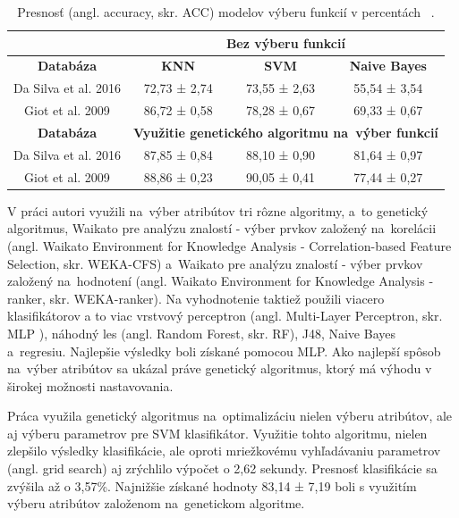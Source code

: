 \documentclass[runningheads]{llncs}
\begin{document}
\begin{table}[]
\centering
\caption{Presnosť (angl. accuracy, skr. ACC) modelov výberu funkcií v percentách ~\cite{ref_nascimento}.}\label{tab_vyber_funkci}
\begin{tabular}{|c|c|c|c|}
\hline
                     & \multicolumn{3}{c|}{\textbf{Bez výberu funkcií}}                     \\ \hline
\textbf{Databáza}    & \textbf{KNN}          & \textbf{SVM}          & \textbf{Naive Bayes} \\ \hline
Da Silva et al. 2016 & 72,73 ± 2,74           & 73,55 ± 2,63           & 55,54 ± 3,54           \\ \hline
Giot et al. 2009     & 86,72 ± 0,58           & 78,28 ± 0,67           & 69,33 ± 0,67          \\ \hline
\textbf{Databáza}    & \multicolumn{3}{c|}{\textbf{Využitie genetického algoritmu na~výber funkcií}} \\ \hline
Da Silva et al. 2016 & 87,85 ± 0,84            & 88,10 ± 0,90           & 81,64 ± 0,97          \\ \hline
Giot et al. 2009     & 88,86 ± 0,23           & 90,05 ± 0,41            & 77,44 ± 0,27          \\ \hline
\end{tabular}
\end{table}


V práci \cite{ref_babatunde} autori využili na~výber atribútov tri rôzne algoritmy, a~to 
genetický algoritmus, Waikato pre analýzu znalostí - výber prvkov založený na~korelácii (angl. Waikato Environment for Knowledge Analysis - Correlation-based Feature Selection, skr. WEKA-CFS) a~Waikato pre analýzu znalostí - výber prvkov založený na~hodnotení (angl. Waikato Environment for Knowledge Analysis - ranker, skr. WEKA-ranker). Na vyhodnotenie taktiež použili viacero klasifikátorov
a to viac vrstvový perceptron (angl. Multi-Layer Perceptron, skr. MLP ), náhodný les (angl. Random Forest, skr. RF), J48, Naive Bayes a~regresiu. Najlepšie výsledky 
boli získané pomocou MLP. Ako najlepší spôsob na~výber atribútov sa ukázal práve genetický algoritmus,
ktorý má výhodu v širokej možnosti nastavovania.

Práca \cite{ref_zhao} využila genetický algoritmus na~optimalizáciu nielen výberu atribútov, 
ale aj výberu parametrov pre SVM klasifikátor. Využitie tohto algoritmu, nielen zlepšilo výsledky klasifikácie, 
ale oproti  
mriežkovému vyhľadávaniu parametrov (angl. grid search) aj zrýchlilo výpočet o 2,62 sekundy.
Presnosť klasifikácie sa zvýšila až o 3,57\%. Najnižšie 
získané hodnoty 83,14 ± 7,19 boli s využitím výberu atribútov založenom na~genetickom algoritme.
\end{document}
